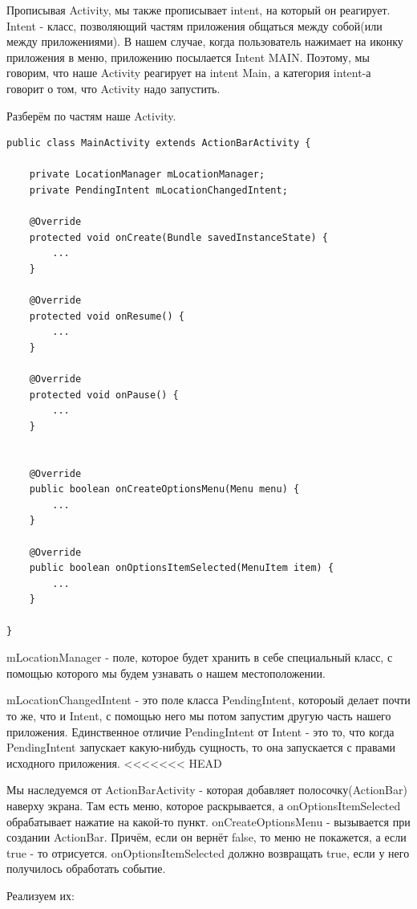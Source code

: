 \documentclass[12 pt]{article}
\begin{document}
    Прописывая Activity, мы также прописывает intent, на который он реагирует. Intent - класс, позволяющий частям приложения общаться между собой(или между приложениями). В нашем случае, когда пользователь нажимает на иконку приложения в меню, приложению посылается Intent MAIN. Поэтому, мы говорим, что наше Activity реагирует на intent Main, а категория intent-а говорит о том, что Activity надо запустить.
    
    Разберём по частям наше Activity. 
    
    \begin{lstlisting}
public class MainActivity extends ActionBarActivity {

    private LocationManager mLocationManager;
    private PendingIntent mLocationChangedIntent;

    @Override
    protected void onCreate(Bundle savedInstanceState) {
        ...
    }

    @Override
    protected void onResume() {
        ...
    }

    @Override
    protected void onPause() {
        ...
    }


    @Override
    public boolean onCreateOptionsMenu(Menu menu) {
        ...
    }

    @Override
    public boolean onOptionsItemSelected(MenuItem item) {
        ...
    }

}
    \end{lstlisting}
    
    mLocationManager - поле, которое будет хранить в себе специальный класс, с помощью которого мы будем узнавать о нашем местоположении. 
    
    mLocationChangedIntent - это поле класса PendingIntent, котороый делает почти то же, что и Intent, с помощью него мы потом запустим другую часть нашего приложения. Единственное отличие PendingIntent от Intent - это то, что когда PendingIntent запускает какую-нибудь сущность, то она запускается с правами исходного приложения. 
<<<<<<< HEAD
    
    Мы наследуемся от ActionBarActivity - которая добавляет полосочку(ActionBar) наверху экрана. Там есть меню, которое раскрывается, а onOptionsItemSelected обрабатывает нажатие на какой-то пункт. onCreateOptionsMenu - вызывается при создании ActionBar. Причём, если он вернёт false, то меню не покажется, а если true - то отрисуется. onOptionsItemSelected должно возвращать true, если у него получилось обработать событие.
    
    Реализуем их:
    
\end{document}
